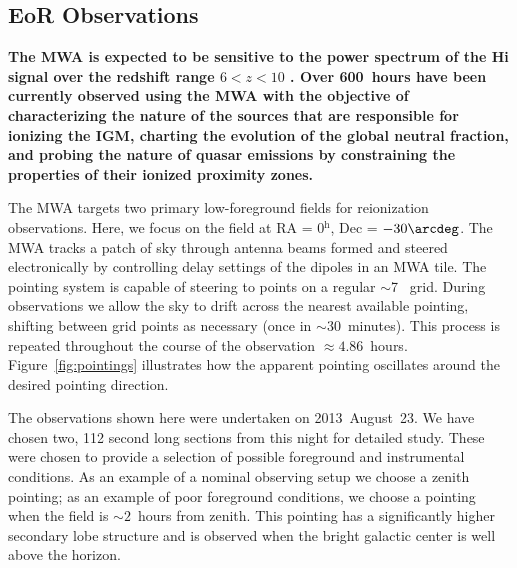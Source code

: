 \documentclass[preprint2,iop,numberedappendix]{emulateapj}
\begin{document}

\subsection{EoR Observations}\label{sec:obsparms}

{\bf The MWA is expected to be sensitive to the power spectrum of the H{\sc i} signal over the redshift range $6<z<10$ \citep{thy13,bea13}. Over 600~hours have been currently observed using the MWA with the objective of characterizing the nature of the sources that are responsible for ionizing the IGM, charting the evolution of the global neutral fraction, and probing the nature of quasar emissions by constraining the properties of their ionized proximity zones.}

The MWA targets two primary low-foreground fields for reionization observations. Here, we focus on the field at RA = 0$^\textrm{h}$, Dec = $-30\arcdeg$. The MWA tracks a patch of sky through antenna beams formed and steered electronically by controlling delay settings of the dipoles in an MWA tile. The pointing system is capable of steering to points on a regular $\sim$7\arcdeg~ grid. During observations we allow the sky to drift across the nearest available pointing, shifting between grid points as necessary (once in $\sim 30$~minutes). This process is repeated throughout the course of the observation $\approx 4.86$~hours. Figure~\ref{fig:pointings} illustrates how the apparent pointing oscillates around the desired pointing direction. 

The observations shown here were undertaken on 2013~August~23. %
We have chosen two, 112 second long sections from this night for detailed study. These were chosen to provide a selection of possible foreground and instrumental conditions. As an example of a nominal observing setup we choose a zenith pointing; as an example of poor foreground conditions, we choose a pointing when the field is $\sim 2$~hours from zenith. This pointing has a significantly higher secondary lobe structure and is observed when the bright galactic center is well above the horizon. 
\end{document}
